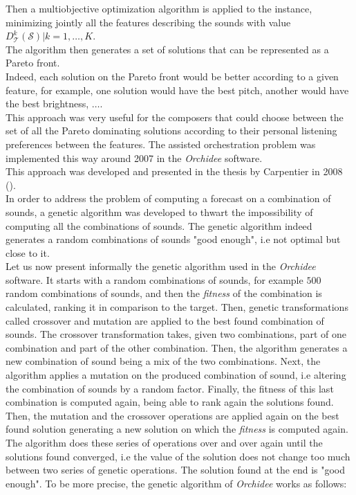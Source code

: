 \documentclass[a4paper]{book}
\newcommand{\alex}[2]{\textcolor{red}{#1}}
\begin{document}
Then a multiobjective optimization algorithm is applied to the instance, minimizing jointly all the features describing the sounds with value $D^k_\mathcal{T}(\mathcal{S}) | k=1,\ldots,K$.\\
The algorithm then generates a set of solutions that can be represented as a Pareto front.\\

Indeed, each solution on the Pareto front would be better according to a given feature, for example, one solution would have the best pitch, another would have the best brightness, $\ldots$.\\
This approach was very useful for the composers that could choose between the set of all the Pareto dominating solutions according to their personal listening preferences between the features. The assisted orchestration problem was implemented this way around 2007 in the \textit{Orchidee} software.\\
This approach was developed and presented in the thesis by Carpentier in 2008 (\cite{carpentier2008approche}).\\

In order to address the problem of computing a forecast on a combination of sounds, a genetic algorithm was developed to thwart the impossibility of computing all the combinations of sounds. The genetic algorithm indeed generates a random combinations of sounds "good enough", i.e not optimal but close to it. \\
Let us now present informally the genetic algorithm used in the \textit{Orchidee} software. It starts with a random combinations of sounds, for example $500$ random combinations of sounds, and then the \textit{fitness} of the combination is calculated, ranking it in comparison to the target. Then, genetic transformations called crossover and mutation are applied to the best found combination of sounds. The crossover transformation takes, given two combinations, part of one combination and part of the other combination. Then, the algorithm generates a new combination of sound being a mix of the two combinations. Next, the algorithm applies a mutation on the produced combination of sound, i.e altering the combination of sounds by a random factor. Finally, the fitness of this last combination is computed again, being able to rank again the solutions found. Then, the mutation and the crossover operations are applied again on the best found solution generating a new solution on which the \textit{fitness} is computed again. The algorithm does these series of operations over and over again until the solutions found converged, i.e the value of the solution does not change too much between two series of genetic operations. The solution found at the end is "good enough". To be more precise, the genetic algorithm of \textit{Orchidee} works as follows:\\
\end{document}
